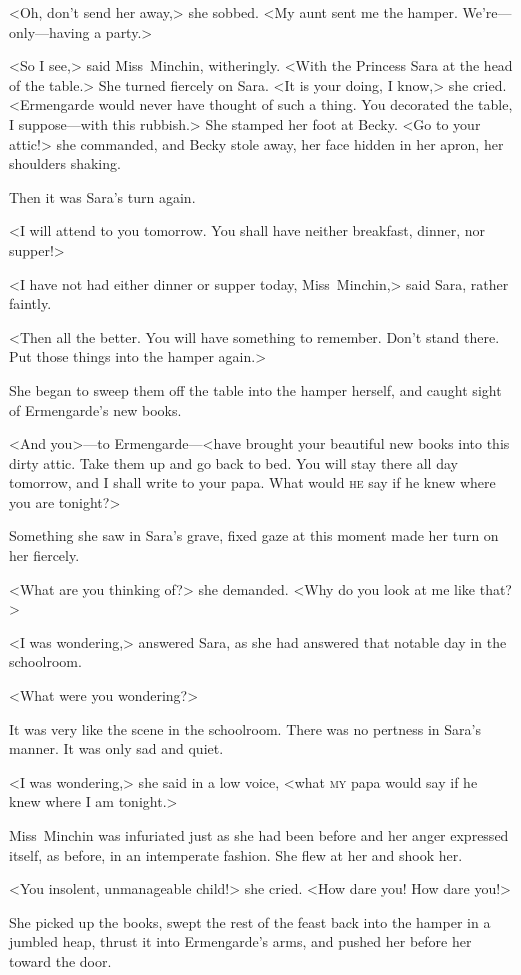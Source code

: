 <Oh, don't send her away,> she sobbed. <My aunt sent me the hamper. We're—only—having a party.>

<So I see,> said Miss~Minchin, witheringly. <With the Princess Sara at the head of the table.> She turned fiercely on Sara. <It is your doing, I know,> she cried. <Ermengarde would never have thought of such a thing. You decorated the table, I suppose—with this rubbish.> She stamped her foot at Becky. <Go to your attic!> she commanded, and Becky stole away, her face hidden in her apron, her shoulders shaking.

Then it was Sara's turn again.

<I will attend to you tomorrow. You shall have neither breakfast, dinner, nor supper!>

<I have not had either dinner or supper today, Miss~Minchin,> said Sara, rather faintly.

<Then all the better. You will have something to remember. Don't stand there. Put those things into the hamper again.>

She began to sweep them off the table into the hamper herself, and caught sight of Ermengarde's new books.

<And you>—to Ermengarde—<have brought your beautiful new books into this dirty attic. Take them up and go back to bed. You will stay there all day tomorrow, and I shall write to your papa. What would \textsc{he} say if he knew where you are tonight?>

Something she saw in Sara's grave, fixed gaze at this moment made her turn on her fiercely.

<What are you thinking of?> she demanded. <Why do you look at me like that?>

<I was wondering,> answered Sara, as she had answered that notable day in the schoolroom.

<What were you wondering?>

It was very like the scene in the schoolroom. There was no pertness in Sara's manner. It was only sad and quiet.

<I was wondering,> she said in a low voice, <what \textsc{my} papa would say if he knew where I am tonight.>

Miss~Minchin was infuriated just as she had been before and her anger expressed itself, as before, in an intemperate fashion. She flew at her and shook her.

<You insolent, unmanageable child!> she cried. <How dare you! How dare you!>

She picked up the books, swept the rest of the feast back into the hamper in a jumbled heap, thrust it into Ermengarde's arms, and pushed her before her toward the door.

